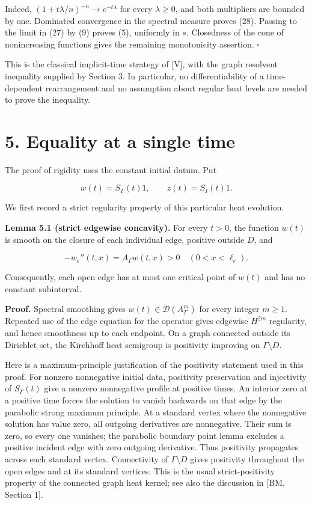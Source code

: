 \documentclass[11pt]{article}
\begin{document}
Indeed, \((1+t\lambda/n)^{-n}\to e^{-t\lambda}\) for every
\(\lambda\ge0\), and both multipliers are bounded by one. Dominated
convergence in the spectral measure proves (28). Passing to the limit in
(27) by (9) proves (5), uniformly in \(s\). Closedness of the cone of
nonincreasing functions gives the remaining monotonicity assertion.
\(\square\)

This is the classical implicit-time strategy of {[}V{]}, with the graph
resolvent inequality supplied by Section 3. In particular, no
differentiability of a time-dependent rearrangement and no assumption
about regular heat levels are needed to prove the inequality.

\section{5. Equality at a single time}\label{equality-at-a-single-time}

The proof of rigidity uses the constant initial datum. Put

\[
w(t)=S_\Gamma(t)1,\qquad z(t)=S_I(t)1.
\tag{29}
\]

We first record a strict regularity property of this particular heat
evolution.

\textbf{Lemma 5.1 (strict edgewise concavity).} For every \(t>0\), the
function \(w(t)\) is smooth on the closure of each individual edge,
positive outside \(D\), and

\[
-w_e''(t,x)=A_\Gamma w(t,x)>0
\quad(0<x<\ell_e).
\tag{30}
\]

Consequently, each open edge has at most one critical point of \(w(t)\)
and has no constant subinterval.

\textbf{Proof.} Spectral smoothing gives
\(w(t)\in\mathcal D(A_\Gamma^m)\) for every integer \(m\ge1\). Repeated
use of the edge equation for the operator gives edgewise \(H^{2m}\)
regularity, and hence smoothness up to each endpoint. On a graph
connected outside its Dirichlet set, the Kirchhoff heat semigroup is
positivity improving on \(\Gamma\setminus D\).

Here is a maximum-principle justification of the positivity statement
used in this proof. For nonzero nonnegative initial data, positivity
preservation and injectivity of \(S_\Gamma(t)\) give a nonzero
nonnegative profile at positive times. An interior zero at a positive
time forces the solution to vanish backwards on that edge by the
parabolic strong maximum principle. At a standard vertex where the
nonnegative solution has value zero, all outgoing derivatives are
nonnegative. Their sum is zero, so every one vanishes; the parabolic
boundary point lemma excludes a positive incident edge with zero
outgoing derivative. Thus positivity propagates across each standard
vertex. Connectivity of \(\Gamma\setminus D\) gives positivity
throughout the open edges and at its standard vertices. This is the
usual strict-positivity property of the connected graph heat kernel; see
also the discussion in {[}BM, Section 1{]}.
\end{document}
